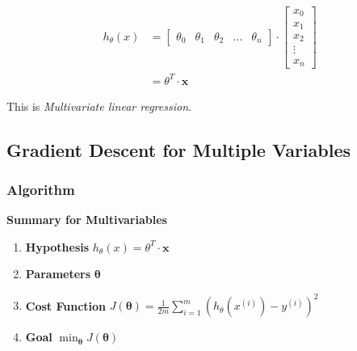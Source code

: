             \begin{equation}
                \begin{split}
                 h_\theta (x) &= \left[ \begin{array}{ccccc}
                                                \theta_0 & \theta_1 & \theta_2 & \dots & \theta_n 
        \end{array} 
                                    \right] \cdot \left[ \begin{array}{c}
                                                                x_0 \\
                                                                x_1 \\
                                                                x_2 \\
                                                                \vdots \\
                                                                x_n
                                                                 \end{array} \right] \\
                                                                 & = \theta^T\cdot \textbf{x}
            \end{split}
        \end{equation}
        

        This is \emph{Multivariate linear regression}.










    \subsection{Gradient Descent for Multiple Variables}
        \subsubsection{Algorithm}
            \textbf{Summary for Multivariables} 
                \begin{enumerate}
                    \item \textbf{Hypothesis  }$h_\theta (x) = \theta^T \cdot \textbf{x}$
                    \item \textbf{Parameters } $\mathbf{\theta}$
                    \item \textbf{Cost Function } $ J(\mathbf{\theta}) = \frac{1}{2m} \sum_{i=1}^{m} (h_\theta(x^{(i)}) - y^{(i)} )^2 $
                    \item \textbf{Goal } $ \min_{\mathbf{\theta}} J( \mathbf{\theta}) $
                \end{enumerate}

